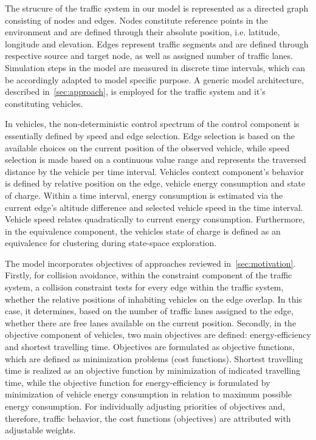\documentclass[conference]{../cls/IEEEtran}
\begin{document}
The strucure of the traffic system in our model is represented as a directed
graph consisting of nodes and edges. Nodes constitute reference points in the 
environment and are defined through their absolute position, i.e. latitude,
longitude and elevation. Edges represent traffic segments and are defined
through respective source and target node, as well as assigned number of traffic lanes.
Simulation steps in the model are measured in discrete time intervals, which
can be accordingly adapted to model specific purpose. A generic model
architecture, described in~\ref{sec:approach}, is employed for the
traffic system and it's constituting vehicles.

In vehicles, the non-deterministic control spectrum of the control
component is essentially defined by speed and edge selection.
Edge selection is based on the available choices on the current position of the observed
vehicle, while speed selection is made based on a continuous value range and
represents the traversed distance by the vehicle per time interval. Vehicles
context component's behavior is defined by relative position on the edge, vehicle energy
consumption and state of charge. Within a time interval, energy consumption
is estimated via the current edge's altitude difference and selected
vehicle speed in the time interval. Vehicle speed relates quadratically to
current energy consumption. Furthermore, in the equivalence component, the
vehicles state of charge is defined as an equivalence for clustering during state-space exploration.

The model incorporates objectives of approaches reviewed in~\ref{sec:motivation}. 
Firstly, for collision avoidance, within the constraint
component of the traffic system, a collision constraint tests for every
edge within the traffic system, whether the relative positions of inhabiting
vehicles on the edge overlap. In this case, it determines, based on the number of traffic
lanes assigned to the edge, whether there are free lanes available on the
current position. Secondly, in the objective component of vehicles, two main
objectives are defined: energy-efficiency and shortest travelling time.
Objectives are formulated as objective functions, which are defined as
minimization problems (cost functions). Shortest travelling time is realized as
an objective function by minimization of indicated travelling time, while the
objective function for energy-efficiency is formulated by minimization of vehicle
energy consumption in relation to maximum possible energy consumption.
For individually adjusting priorities of objectives and, therefore, traffic
behavior, the cost functions (objectives) are attributed with adjustable
weights.
\end{document}
